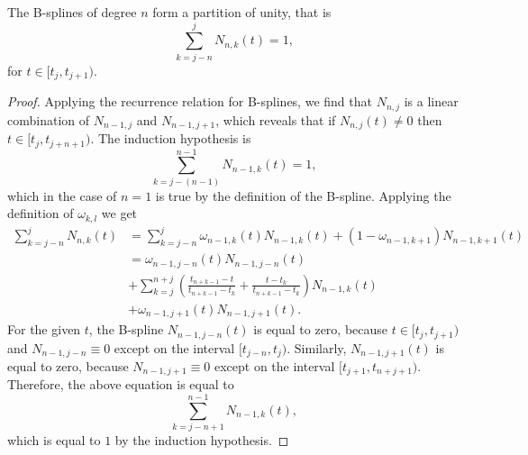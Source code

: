 
\begin{theorem}
	The B-splines of degree $n$ form a partition of unity, that is
	\begin{equation}
		\sum_{k=j-n}^j N_{n,k}(t) = 1,
	\end{equation}
	for $t \in [t_j, t_{j+1})$.
\end{theorem}
\begin{proof}
	Applying the recurrence relation for B-splines, we find that $N_{n,j}$ is a linear combination of $N_{n-1, j}$ and $N_{n-1, j+1}$, which reveals that if $N_{n, j}(t) \neq 0$ then $t \in [t_j, t_{j+n+1})$. The induction hypothesis is
	\begin{equation}
		\sum_{k=j-(n-1)}^{n-1} N_{n-1,k}(t) = 1,
	\end{equation}
	which in the case of $n=1$ is true by the definition of the B-spline. Applying the definition of $\omega_{k,l}$ we get
	\begin{align*}
		\sum_{k=j-n}^j N_{n,k}(t)	&= \sum_{k=j-n}^j \omega_{n-1, k}(t) N_{n-1, k}(t) + (1-\omega_{n-1, k+1}) N_{n-1, k+1}(t) \\
									&= \omega_{n-1, j-n}(t) N_{n-1, j-n}(t)\\
									&+ \sum_{k=j}^{n+j} \left(\frac{t_{n+k-1} - t}{t_{n+k-1} - t_{k}} + \frac{t - t_k}{t_{n+k-1} - t_k}\right) N_{n-1,k}(t)\\
									&+ \omega_{n-1, j+1}(t) N_{n-1, j+1}(t).
	\end{align*}
	For the given $t$, the B-spline $N_{n-1, j-n}(t)$ is equal to zero, because $t \in [t_j, t_{j+1})$ and $N_{n-1, j-n} \equiv 0$ except on the interval $[t_{j-n}, t_j)$.
	Similarly, $N_{n-1, j+1}(t)$ is equal to zero, because $N_{n-1, j+1} \equiv 0$ except on the interval $[t_{j+1}, t_{n+j+1})$. Therefore, the above equation is equal to
	\begin{equation}
		\sum_{k=j-n+1}^{n-1} N_{n-1,k}(t),
	\end{equation}
	which is equal to $1$ by the induction hypothesis.
\end{proof}








